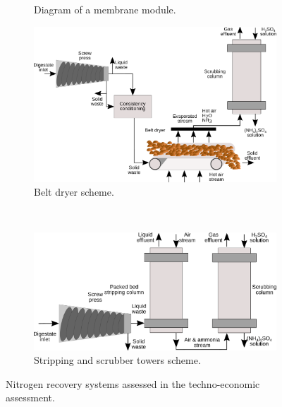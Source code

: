 \begin{refsection}[referencesCh6]
\begin{figure}
\begin{subfigure}{.5\textwidth}
	\caption{Diagram of a membrane module.}
	\label{fig:membrane_diagrams}
\end{subfigure}%
\begin{subfigure}{.5\textwidth}
	\centering
	\includegraphics[width=0.7\linewidth, trim={0cm 0cm 0cm 0cm},clip]{gfx/Chapter6/BeltDryerFinal3.pdf} 
	\caption{Belt dryer scheme.}
	\label{fig:BeltDryerScheme}
\end{subfigure}
\\
\centering
\begin{subfigure}{.4\textwidth}
\vspace{0.5cm}
\centering
	\includegraphics[width=0.75\linewidth, trim={0cm 0cm 0cm 0cm},clip]{gfx/Chapter6/StrippingScrubbing.pdf} 
	\caption{Stripping and scrubber towers scheme.}
	\label{fig:ScrubberScheme}
\end{subfigure}
\caption{Nitrogen recovery systems assessed in the techno-economic assessment.}
\label{fig:NRcoveryTechsDiagrams}
\end{figure}



\end{refsection}
